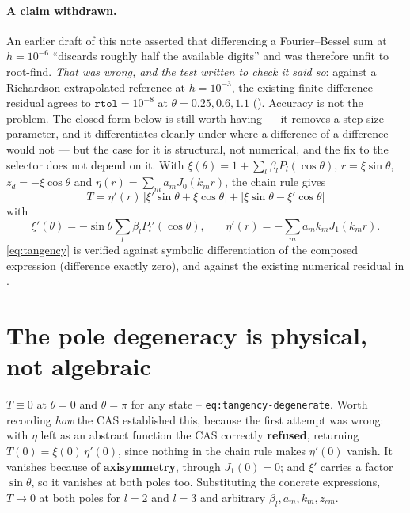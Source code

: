 \documentclass[11pt]{article}
\begin{document}
\paragraph{A claim withdrawn.} An earlier draft of this note asserted that differencing a
Fourier--Bessel sum at $h=10^{-6}$ ``discards roughly half the available digits'' and was
therefore unfit to root-find. \emph{That was wrong, and the test written to check it said so}:
against a Richardson-extrapolated reference at $h=10^{-3}$, the existing finite-difference
residual agrees to $\texttt{rtol}=10^{-8}$ at $\theta=0.25,0.6,1.1$ ().
Accuracy is not the problem. The closed form below is still worth having --- it removes a
step-size parameter, and it differentiates cleanly under  where a difference of
a difference would not --- but the case for it is structural, not numerical, and the fix to the
selector does not depend on it. With
$\xi(\theta)=1+\sum_l\beta_lP_l(\cos\theta)$, $r=\xi\sin\theta$, $z_d=-\xi\cos\theta$ and
$\eta(r)=\sum_ma_mJ_0(k_mr)$, the chain rule gives
\begin{equation}
  \boxed{\;T=\eta'(r)\,\big[\xi'\sin\theta+\xi\cos\theta\big]
           +\big[\xi\sin\theta-\xi'\cos\theta\big]\;}
  \label{eq:tangency}
\end{equation}
with
\begin{equation}
  \xi'(\theta)=-\sin\theta\sum_l\beta_l P_l'(\cos\theta)\text{,}\qquad
  \eta'(r)=-\sum_m a_m k_m J_1(k_m r)\text{.}
\end{equation}
\eqref{eq:tangency} is verified against symbolic differentiation of the composed expression
(difference exactly zero), and against the existing numerical residual in
.

\section{The pole degeneracy is physical, not algebraic}

$T\equiv0$ at $\theta=0$ and $\theta=\pi$ for any state -- \texttt{eq:tangency-degenerate}. Worth
recording \emph{how} the CAS established this, because the first attempt was wrong: with $\eta$
left as an abstract function the CAS correctly \textbf{refused}, returning
$T(0)=\xi(0)\,\eta'(0)$, since nothing in the chain rule makes $\eta'(0)$ vanish. It vanishes
because of \textbf{axisymmetry}, through $J_1(0)=0$; and $\xi'$ carries a factor $\sin\theta$, so
it vanishes at both poles too. Substituting the concrete expressions, $T\to0$ at both poles for
$l=2$ and $l=3$ and arbitrary $\beta_l,a_m,k_m,z_{cm}$.
\end{document}
